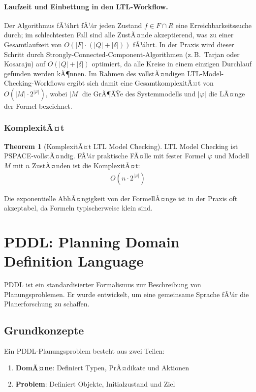 ﻿\documentclass[a4paper,12pt]{article}
\theoremstyle{definition}
\newtheorem{theorem}{Theorem}[section]
\begin{document}
\paragraph*{Laufzeit und Einbettung in den LTL-Workflow.}
Der Algorithmus fÃ¼hrt fÃ¼r jeden Zustand $f \in F \cap R$ eine Erreichbarkeitssuche durch; im schlechtesten Fall sind alle ZustÃ¤nde akzeptierend, was zu einer Gesamtlaufzeit von $O(|F| \cdot (|Q| + |\delta|))$ fÃ¼hrt. In der Praxis wird dieser Schritt durch Strongly-Connected-Component-Algorithmen (z.\,B.\ Tarjan oder Kosaraju) auf $O(|Q| + |\delta|)$ optimiert, da alle Kreise in einem einzigen Durchlauf gefunden werden kÃ¶nnen. Im Rahmen des vollstÃ¤ndigen LTL-Model-Checking-Workflows ergibt sich damit eine GesamtkomplexitÃ¤t von $O(|M| \cdot 2^{|\varphi|})$, wobei $|M|$ die GrÃ¶ÃŸe des Systemmodells und $|\varphi|$ die LÃ¤nge der Formel bezeichnet.

\subsubsection{KomplexitÃ¤t}

\begin{theorem}[KomplexitÃ¤t LTL Model Checking]
	LTL Model Checking ist PSPACE-vollstÃ¤ndig. FÃ¼r praktische FÃ¤lle mit fester Formel $\varphi$ und Modell $M$ mit $n$ ZustÃ¤nden ist die KomplexitÃ¤t:
	\begin{align}
	O(n \cdot 2^{|\varphi|})
	\end{align}
\end{theorem}

Die exponentielle AbhÃ¤ngigkeit von der FormellÃ¤nge ist in der Praxis oft akzeptabel, da Formeln typischerweise klein sind.

\section{PDDL: Planning Domain Definition Language}

PDDL ist ein standardisierter Formalismus zur Beschreibung von Planungsproblemen. Er wurde entwickelt, um eine gemeinsame Sprache fÃ¼r die Planerforschung zu schaffen.

\subsection{Grundkonzepte}

Ein PDDL-Planungsproblem besteht aus zwei Teilen:
\begin{enumerate}
	\item \textbf{DomÃ¤ne}: Definiert Typen, PrÃ¤dikate und Aktionen
	\item \textbf{Problem}: Definiert Objekte, Initialzustand und Ziel
\end{enumerate}
\end{document}
